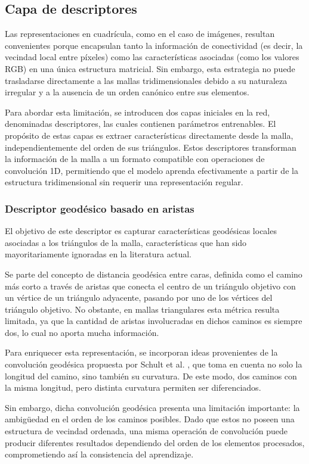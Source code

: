 \subsection{Capa de descriptores}
Las representaciones en cuadrícula, como en el caso de imágenes, resultan convenientes porque encapsulan tanto la información de conectividad (es decir, la vecindad local entre píxeles) como las características asociadas (como los valores RGB) en una única estructura matricial. Sin embargo, esta estrategia no puede trasladarse directamente a las mallas tridimensionales debido a su naturaleza irregular y a la ausencia de un orden canónico entre sus elementos.

Para abordar esta limitación, se introducen dos capas iniciales en la red, denominadas descriptores, las cuales contienen parámetros entrenables. El propósito de estas capas es extraer características directamente desde la malla, independientemente del orden de sus triángulos. Estos descriptores transforman la información de la malla a un formato compatible con operaciones de convolución 1D, permitiendo que el modelo aprenda efectivamente a partir de la estructura tridimensional sin requerir una representación regular.

\subsubsection{Descriptor geodésico basado en aristas}
El objetivo de este descriptor es capturar características geodésicas locales asociadas a los triángulos de la malla, características que han sido mayoritariamente ignoradas en la literatura actual. 

Se parte del concepto de distancia geodésica entre caras, definida como el camino más corto a través de aristas que conecta el centro de un triángulo objetivo con un vértice de un triángulo adyacente, pasando por uno de los vértices del triángulo objetivo. No obstante, en mallas triangulares esta métrica resulta limitada, ya que la cantidad de aristas involucradas en dichos caminos es siempre dos, lo cual no aporta mucha información.

Para enriquecer esta representación, se incorporan ideas provenientes de la convolución geodésica propuesta por Schult et al. \cite{schult_dualconvmesh-net_2020}, que toma en cuenta no solo la longitud del camino, sino también su curvatura. De este modo, dos caminos con la misma longitud, pero distinta curvatura permiten ser diferenciados.

Sin embargo, dicha convolución geodésica presenta una limitación importante: la ambigüedad en el orden de los caminos posibles. Dado que estos no poseen una estructura de vecindad ordenada, una misma operación de convolución puede producir diferentes resultados dependiendo del orden de los elementos procesados, comprometiendo así la consistencia del aprendizaje.

